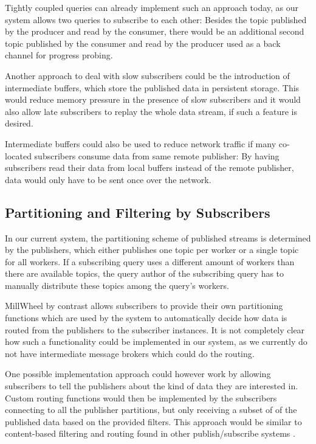 Tightly coupled queries can already implement such an approach today, as our
system allows two queries to subscribe to each other: Besides the topic published by the producer and
read by the consumer, there would be an additional second topic published by the
consumer and read by the producer used as a back channel for progress probing.

Another approach to deal with slow subscribers could be the introduction of
intermediate buffers, which store the published data in persistent storage. 
This would reduce memory pressure in the presence of slow subscribers and it
would also allow late subscribers to replay the whole data stream, if such
a feature is desired.

Intermediate buffers could also be used to reduce network traffic if many
co-located subscribers consume data from same remote publisher: By having
subscribers read their data from local buffers instead of the remote publisher,
data would only have to be sent once over the network.

\subsection{Partitioning and Filtering by Subscribers}

In our current system, the partitioning scheme of published streams is
determined by the publishers, which either publishes one topic per worker or
a single topic for all workers. If a subscribing query uses a different amount
of workers than there are available topics, the query author of the subscribing
query has to manually distribute these topics among the query's workers.

MillWheel by contrast allows subscribers to provide their own partitioning
functions which are used by the system to automatically decide how data is
routed from the publishers to the subscriber instances. It is not completely
clear how such a functionality could be implemented in our system, as we
currently do not have intermediate message brokers which could do the routing.

One possible implementation approach could however work by allowing subscribers
to tell the publishers about the kind of data they are interested in. Custom
routing functions would then be implemented by the subscribers connecting
to all the publisher partitions, but only receiving a subset of of the published
data based on the provided filters. This approach would be similar to
content-based filtering and routing found in other publish/subscribe systems
\cite{pubsub}.

